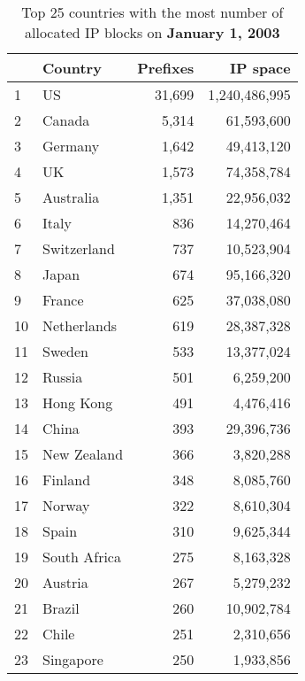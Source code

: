 \begin{table*}[p]
\begin{minipage}[t]{0.48\textwidth}
	\begin{center}
	\caption{Top 25 countries with the most number of allocated IP blocks on \textbf{January 1, 2003}}
	\label{tab:top25 rir prefixes 2003}
	\begin{tabular}{|l||l|r|r|}
		\hline
		&      \bf Country		& \bf Prefixes  &  \bf  IP space 		\tabularnewline \hline
1       &       US      		&       31,699  &       1,240,486,995   \tabularnewline
2       &       Canada  		&       5,314   &       61,593,600      \tabularnewline
3       &       Germany 		&       1,642   &       49,413,120      \tabularnewline
4       &       UK      		&       1,573   &       74,358,784      \tabularnewline
5       &       Australia       &       1,351   &       22,956,032      \tabularnewline
6       &       Italy   		&       836     &       14,270,464      \tabularnewline
7       &       Switzerland     &       737     &       10,523,904      \tabularnewline
8       &       Japan   		&       674     &       95,166,320      \tabularnewline
9       &       France  		&       625     &       37,038,080      \tabularnewline
10      &       Netherlands     &       619     &       28,387,328      \tabularnewline
11      &       Sweden  		&       533     &       13,377,024      \tabularnewline
12      &       Russia  		&       501     &       6,259,200       \tabularnewline
13      &       Hong Kong       &       491     &       4,476,416       \tabularnewline
14      &       China   		&       393     &       29,396,736      \tabularnewline
15      &       New Zealand     &       366     &       3,820,288       \tabularnewline
16      &       Finland 		&       348     &       8,085,760       \tabularnewline
17      &       Norway  		&       322     &       8,610,304       \tabularnewline
18      &       Spain   		&       310     &       9,625,344       \tabularnewline
19      &       South Africa    &       275     &       8,163,328       \tabularnewline
20      &       Austria 		&       267     &       5,279,232       \tabularnewline
21      &       Brazil  		&       260     &       10,902,784      \tabularnewline
22      &       Chile   		&       251     &       2,310,656       \tabularnewline
23      &       Singapore       &       250     &       1,933,856       \tabularnewline

\end{tabular}
\end{center}
\end{minipage}
\end{table*}
